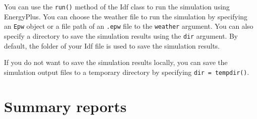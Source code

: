 \documentclass[
]{book}
\newenvironment{Shaded}{\begin{snugshade}}{\end{snugshade}}
\newcommand{\AttributeTok}[1]{\textcolor[rgb]{0.77,0.63,0.00}{#1}}
\newcommand{\DocumentationTok}[1]{\textcolor[rgb]{0.56,0.35,0.01}{\textbf{\textit{#1}}}}
\newcommand{\FunctionTok}[1]{\textcolor[rgb]{0.00,0.00,0.00}{#1}}
\newcommand{\NormalTok}[1]{#1}
\newcommand{\OtherTok}[1]{\textcolor[rgb]{0.56,0.35,0.01}{#1}}
\newcommand{\SpecialCharTok}[1]{\textcolor[rgb]{0.00,0.00,0.00}{#1}}
\newcommand{\StringTok}[1]{\textcolor[rgb]{0.31,0.60,0.02}{#1}}
\begin{document}
You can use the \texttt{run()} method of the Idf class to run the simulation using EnergyPlus. You can choose the weather file to run the simulation by specifying an \texttt{Epw} object or a file path of an \texttt{.epw} file to the \texttt{weather} argument. You can also specify a directory to save the simulation results using the \texttt{dir} argument. By default, the folder of your Idf file is used to save the simulation results.

\begin{Shaded}
\end{Shaded}

If you do not want to save the simulation results locally, you can save the simulation output files to a temporary directory by specifying \texttt{dir\ =\ tempdir()}.

\begin{Shaded}
\end{Shaded}

\hypertarget{summary}{%
\chapter{Summary reports}\label{summary}}
\end{document}
